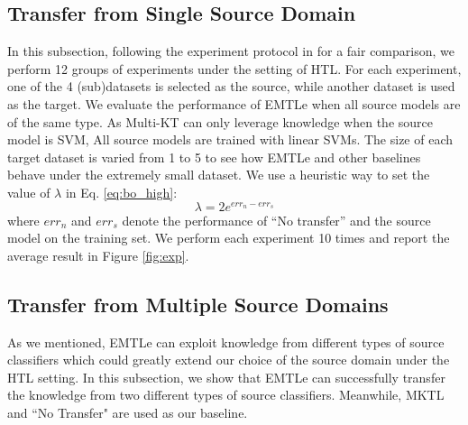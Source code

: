 \subsection{Transfer from Single Source Domain}
In this subsection, following the experiment protocol in \cite{jie2011multiclass,tommasi2014learning} for a fair comparison, we perform 12 groups of experiments under the setting of HTL. 
For each experiment, one of the 4 (sub)datasets is selected as the source, while another dataset is used as the target. We evaluate the performance of EMTLe when all source models are of the same type. As Multi-KT can only leverage knowledge when the source model is SVM, All source models are trained with linear SVMs.
The size of each target dataset is varied from 1 to 5 to see how EMTLe and other baselines behave under the extremely small dataset. We use a heuristic way to set the value of $\lambda$ in Eq. \eqref{eq:bo_high}:
\begin{equation}
\lambda = 2e^{err_{n}-err_{s}}
\end{equation}
where $err_{n}$ and $err_{s}$ denote the performance of ``No transfer'' and the source model on the training set.
We perform each experiment 10 times and report the average result in Figure \ref{fig:exp}. 


\subsection{Transfer from Multiple Source Domains}
As we mentioned, EMTLe can exploit knowledge from different types of source classifiers which could greatly extend our choice of the source domain under the HTL setting. In this subsection, we show that EMTLe can successfully transfer the knowledge from two different types of source classifiers. Meanwhile, MKTL and ``No Transfer" are used as our baseline. 

